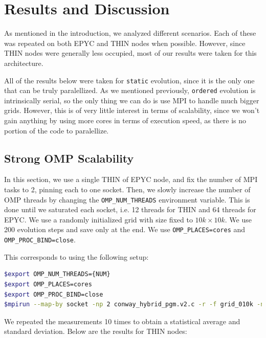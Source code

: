 \documentclass{report}
\begin{document}
\section{Results and Discussion}

As mentioned in the introduction, we analyzed different scenarios. 
Each of these was repeated on both EPYC and THIN nodes when possible. 
However, since THIN nodes were generally less occupied, most of our 
results were taken for this architecture. 

All of the results below were taken for \texttt{static} evolution, since it is 
the only one that can be truly paralellized. As we mentioned previously, 
\texttt{ordered} evolution is intrinsically serial, so the only thing we can 
do is use MPI to handle much bigger grids. However, this is of very little 
interest in terms of scalability, since we won't gain anything by using more 
cores in terms of execution speed, as there is no portion of the code to 
paralellize.


\subsection{Strong OMP Scalability}

In this section, we use a single THIN of EPYC node, and fix the number of MPI 
tasks to 2, pinning each to one socket. Then, we slowly increase the 
number of OMP threads by changing the \texttt{OMP\_NUM\_THREADS} environment 
variable. This is done until we saturated each socket, i.e. 12 threads for THIN 
and 64 threads for EPYC. We use a randomly initialized grid with size fixed to 
$10k \times 10k$. We use 200 evolution steps and save only at the end. 
We use \texttt{OMP\_PLACES=cores} and \texttt{OMP\_PROC\_BIND=close}.

This corresponds to using the following setup:  

\begin{lstlisting}[language=bash]
$export OMP_NUM_THREADS={NUM}
$export OMP_PLACES=cores
$export OMP_PROC_BIND=close
$mpirun --map-by socket -np 2 conway_hybrid_pgm.v2.c -r -f grid_010k -n 200 -s 0 -e 1
\end{lstlisting}

We repeated the measurements 10 times to obtain a statistical average and standard 
deviation. Below are the results for THIN nodes:
\end{document}
